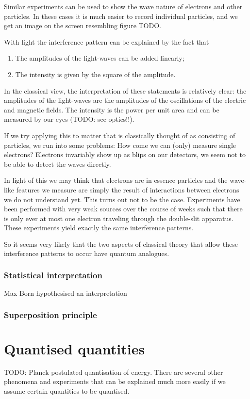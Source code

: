 Similar experiments can be used to show the wave nature of electrons and other particles. In these cases it is much easier to record individual particles, and we get an image on the screen resembling figure TODO.

With light the interference pattern can be explained by the fact that
\begin{enumerate}
\item The amplitudes of the light-waves can be added linearly;
\item The intensity is given by the square of the amplitude.
\end{enumerate}

In the classical view, the interpretation of these statements is relatively clear: the amplitudes of the light-waves are the amplitudes of the oscillations of the electric and magnetic fields. The intensity is the power per unit area and can be measured by our eyes (TODO: see optics!!).

If we try applying this to matter that is classically thought of as consisting of particles, we run into some problems: How come we can (only) measure single electrons? Electrons invariably show up as blips on our detectors, we seem not to be able to detect the waves directly.

In light of this we may think that electrons are in essence particles and the wave-like features we measure are simply the result of interactions between electrons we do not understand yet. This turns out not to be the case. Experiments have been performed with very weak sources over the course of weeks such that there is only ever at most one electron traveling through the double-slit apparatus. These experiments yield exactly the same interference patterns.

So it seems very likely that the two aspects of classical theory that allow these interference patterns to occur have quantum analogues. 

\subsubsection{Statistical interpretation}
Max Born hypothesised an interpretation 

\subsubsection{Superposition principle}


\section{Quantised quantities}
TODO: Planck postulated quantisation of energy. There are several other phenomena and experiments that can be explained much more easily if we assume certain quantities to be quantised.
